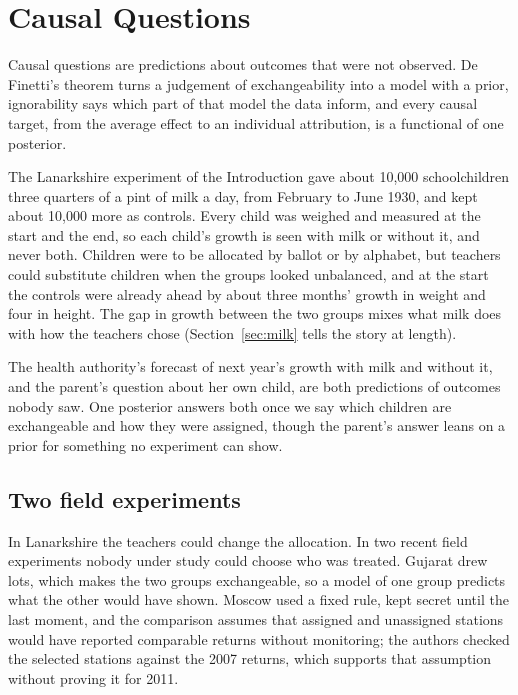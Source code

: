 \chapter{Causal Questions}\label{ch:predictive}

\begin{tcolorbox}[colback=gray!6,colframe=gray!50,title=In brief,fonttitle=\normalfont\itshape,coltitle=black,colbacktitle=gray!15,boxrule=0.4pt,arc=1pt]
Causal questions are predictions about outcomes that were not observed. De Finetti's theorem turns a judgement of exchangeability into a model with a prior, ignorability says which part of that model the data inform, and every causal target, from the average effect to an individual attribution, is a functional of one posterior.
\end{tcolorbox}

The Lanarkshire experiment of the Introduction gave about 10,000 schoolchildren three quarters of a pint of milk a day, from February to June 1930, and kept about 10,000 more as controls. Every child was weighed and measured at the start and the end, so each child's growth is seen with milk or without it, and never both. Children were to be allocated by ballot or by alphabet, but teachers could substitute children when the groups looked unbalanced, and at the start the controls were already ahead by about three months' growth in weight and four in height. The gap in growth between the two groups mixes what milk does with how the teachers chose (Section~\ref{sec:milk} tells the story at length).

The health authority's forecast of next year's growth with milk and without it, and the parent's question about her own child, are both predictions of outcomes nobody saw. One posterior answers both once we say which children are exchangeable and how they were assigned, though the parent's answer leans on a prior for something no experiment can show.

\section{Two field experiments}\label{sec:fieldexp}

In Lanarkshire the teachers could change the allocation. In two recent field experiments nobody under study could choose who was treated. Gujarat drew lots, which makes the two groups exchangeable, so a model of one group predicts what the other would have shown. Moscow used a fixed rule, kept secret until the last moment, and the comparison assumes that assigned and unassigned stations would have reported comparable returns without monitoring; the authors checked the selected stations against the 2007 returns, which supports that assumption without proving it for 2011.


